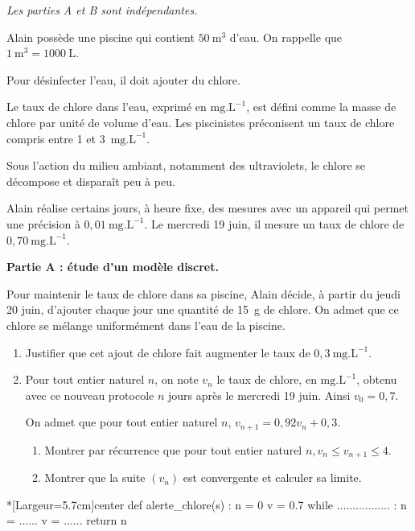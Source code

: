 \textit{Les parties A et B sont indépendantes.}

\medskip


Alain possède une piscine qui contient $50~\text{m}^{3}$ d'eau. On rappelle que $1~\text{m}^{3}=\num{1000}~\text{L}$.

Pour désinfecter l'eau, il doit ajouter du chlore.

\smallskip

Le taux de chlore dans l'eau, exprimé en $\text{mg.L}^{-1}$, est défini comme la masse de chlore par unité de volume d'eau. Les piscinistes préconisent un taux de chlore compris entre 1 et 3~$\text{mg.L}^{-1}$.

\smallskip

Sous l'action du milieu ambiant, notamment des ultraviolets, le chlore se décompose et disparaît peu à peu.

Alain réalise certains jours, à heure fixe, des mesures avec un appareil qui permet une précision à $0,01~\text{mg.L}^{-1}$. Le mercredi 19 juin, il mesure un taux de chlore de $0,70~\text{mg.L}^{-1}$.

\medskip

\textbf{Partie A : étude d'un modèle discret.}

\medskip

Pour maintenir le taux de chlore dans sa piscine, Alain décide, à partir du jeudi 20 juin, d'ajouter chaque jour une quantité de 15~g de chlore. On admet que ce chlore se mélange uniformément dans l'eau de la piscine.

\begin{enumerate}
	\item Justifier que cet ajout de chlore fait augmenter le taux de $0,3~\text{mg.L}^{-1}$.
	\item Pour tout entier naturel $n$, on note $v_{n}$ le taux de chlore, en $\text{mg.L}^{-1}$, obtenu avec ce nouveau protocole $n$ jours après le mercredi 19 juin. Ainsi $v_{0}=0,7$.
	
	On admet que pour tout entier naturel $n$, $v_{n+1}=0,92v_{n}+0,3$.
	\begin{enumerate}
		\item Montrer par récurrence que pour tout entier naturel $n, v_{n} \leqslant v_{n+1} \leqslant 4$.
		\item Montrer que la suite $\left(v_{n}\right)$ est convergente et calculer sa limite.
	\end{enumerate}
\end{enumerate}

\begin{wrapstuff}[r]
\begin{minipage}{5.75cm}
\begin{CodePythonLstAlt}*[Largeur=5.7cm]{center}
def alerte_chlore(s) :
	n = 0
	v = 0.7
	while ................. :
		n = ......
		v = ......
	return n
\end{CodePythonLstAlt}
\end{minipage}
\end{wrapstuff}

